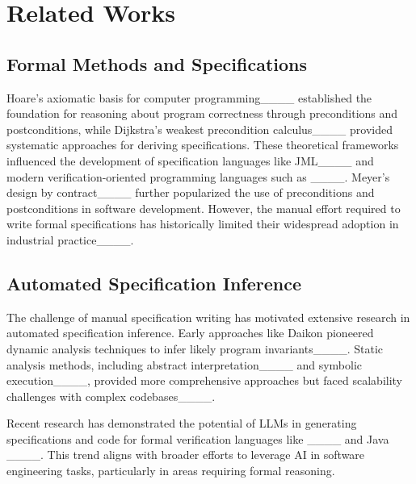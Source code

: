 \section{Related Works}
\subsection{Formal Methods and Specifications}
Hoare's axiomatic basis for computer programming____ established the foundation for reasoning about program correctness through preconditions and postconditions, while Dijkstra's weakest precondition calculus____ provided systematic approaches for deriving specifications. These theoretical frameworks influenced the development of specification languages like JML____ and modern verification-oriented programming languages such as ____. Meyer's design by contract____ further popularized the use of preconditions and postconditions in software development. However, the manual effort required to write formal specifications has historically limited their widespread adoption in industrial practice____.

\subsection{Automated Specification Inference}
The challenge of manual specification writing has motivated extensive research in automated specification inference. Early approaches like Daikon pioneered dynamic analysis techniques to infer likely program invariants____.
Static analysis methods, including abstract interpretation____ and symbolic execution____, provided more comprehensive approaches but faced scalability challenges with complex codebases____.

Recent research has demonstrated the potential of LLMs in generating specifications and code for formal verification languages like  ____ and Java ____. This trend aligns with broader efforts to leverage AI in software engineering tasks, particularly in areas requiring formal reasoning.


